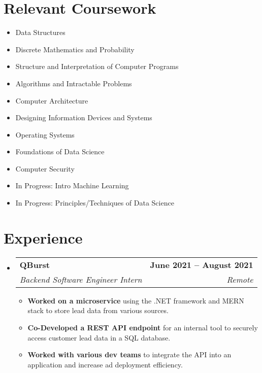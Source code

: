 \documentclass[letterpaper,11pt]{article}
\makeatletter
\newcommand{\resumeItem}[1]{
  \item\small{
    {#1 \vspace{-2pt}}
  }
}
\newcommand{\resumeSubheading}[4]{
  \vspace{-2pt}\item
    \begin{tabular*}{1.0\textwidth}[t]{l@{\extracolsep{\fill}}r}
      \textbf{#1} & \textbf{\small #2} \\
      \textit{\small#3} & \textit{\small #4} \\
    \end{tabular*}\vspace{-7pt}
}
\newcommand{\resumeSubHeadingListStart}{\begin{itemize}[leftmargin=0.0in, label={}]}
\newcommand{\resumeSubHeadingListEnd}{\end{itemize}}
\newcommand{\resumeItemListStart}{\begin{itemize}}
\newcommand{\resumeItemListEnd}{\end{itemize}\vspace{-5pt}}
\makeatother
\begin{document}
\section{Relevant Coursework}
        \begin{multicols}{2}
            \begin{itemize}[itemsep=-5pt, parsep=3pt]
                \item\small Data Structures
                \item Discrete Mathematics and Probability
                \item Structure and Interpretation of Computer Programs
                \item Algorithms and Intractable Problems
                \item Computer Architecture
                \item Designing Information Devices and Systems
                \item Operating Systems
                \item Foundations of Data Science
                \item Computer Security
                \item In Progress: Intro Machine Learning
                \item In Progress: Principles/Techniques of Data Science
            \end{itemize}
        \end{multicols}
        \vspace*{2.0\multicolsep}


\section{Experience}
  \resumeSubHeadingListStart
    \resumeSubheading
      {QBurst}{June 2021 -- August 2021}
      {Backend Software Engineer Intern}{Remote}

      \resumeItemListStart
      \resumeItem{\textbf{Worked on a microservice} using the .NET framework and MERN stack to store lead data from various sources.}
      \resumeItem{\textbf{Co-Developed a REST API endpoint} for an internal tool to securely access customer lead data in a SQL database.}
      \resumeItem{\textbf{Worked with various dev teams} to integrate the API into an application and increase ad deployment efficiency.}

      \resumeItemListEnd
  \resumeSubHeadingListEnd
\vspace{-16pt}
\end{document}
